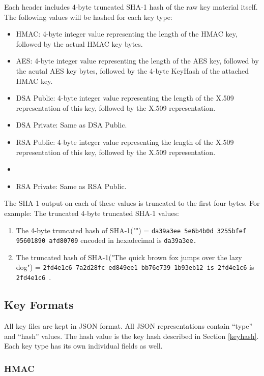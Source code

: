 \documentclass{llncs}
\begin{document}
Each header includes 4-byte truncated SHA-1 hash of the raw key
material itself. The following values will be hashed for each key type:
\begin{itemize}
  \item HMAC: 4-byte integer value representing the length of the HMAC key,
  followed by the actual HMAC key bytes.
  \item AES: 4-byte integer value representing the length of the AES key,
  followed by the acutal AES key bytes, followed by the 4-byte KeyHash of the
  attached HMAC key.
  \item DSA Public: 4-byte integer value representing the length of the X.509
  representation of this key, followed by the X.509 representation.
  \item DSA Private: Same as DSA Public.
  \item RSA Public: 4-byte integer value representing the length of the X.509
  representation of this key, followed by the X.509 representation.  \item
  \item RSA Private: Same as RSA Public. 
\end{itemize}

The SHA-1 output on each of these values is truncated to the first four bytes.
For example: The truncated 4-byte truncated SHA-1 values:
\begin{enumerate}
  \item The 4-byte truncated hash of SHA-1("") = {\tt da39a3ee 5e6b4b0d 3255bfef
  95601890 afd80709} encoded in hexadecimal is {\tt da39a3ee.}
  \item The truncated hash of SHA-1("The quick brown fox jumps over the lazy
  dog") = {\tt 2fd4e1c6 7a2d28fc ed849ee1 bb76e739 1b93eb12 is 2fd4e1c6} is
  {\tt 2fd4e1c6 }.
\end{enumerate}

\subsection{Key Formats}\label{formats}

All key files are kept in JSON format. All JSON representations contain
``type'' and ``hash'' values. The hash value is the key hash described in
Section \ref{keyhash}. Each key type has its own individual fields as well.

\subsubsection{HMAC}
\end{document}
